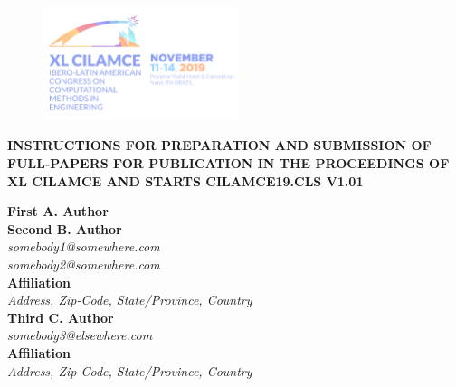 \documentclass{cilamce19}
\begin{document}


 
\begin{titlepage}
	

	
	\begin{figure}
	\flushright
	\includegraphics[width=2.25in]{clm19_lb.png}
    \end{figure}


 \begin{center}
 	\begin{title}
 		\centering
 		\textbf{INSTRUCTIONS FOR PREPARATION AND SUBMISSION OF FULL-PAPERS FOR PUBLICATION IN THE PROCEEDINGS OF XL CILAMCE AND STARTS CILAMCE19.CLS V1.01}
 	\end{title}	
 \end{center}



\noindent
\textbf{First A. Author}
\\
\textbf{Second B. Author}
\\
\textit{somebody1@somewhere.com}\\
\textit{somebody2@somewhere.com}
\\
\textbf{Affiliation}
\\
\textit{Address, Zip-Code, State/Province, Country}
\\
\textbf{Third C. Author}
\\
\textit{somebody3@elsewhere.com}\\
\textbf{Affiliation}
\\
\textit{Address, Zip-Code, State/Province, Country}
\\


\end{titlepage}
\end{document}
